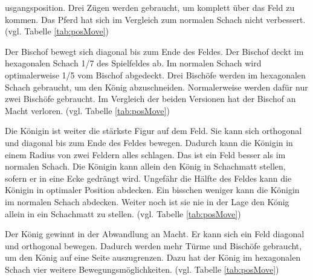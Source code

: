 usgangsposition. Drei Zügen werden gebraucht, um komplett über das Feld zu kommen. Das Pferd hat sich im Vergleich zum normalen Schach nicht verbessert. \cite{GlinskiHexaChess} (vgl. Tabelle \ref{tab:posMove})\par
Der Bischof bewegt sich diagonal bis zum Ende des Feldes. Der Bischof deckt im hexagonalen Schach 1/7 des Spielfeldes ab. Im normalen Schach wird optimalerweise 1/5 vom Bischof abgedeckt. Drei Bischöfe werden im hexagonalen Schach gebraucht, um den König abzuschneiden. Normalerweise werden dafür nur zwei Bischöfe gebraucht. Im Vergleich der beiden Versionen hat der Bischof an Macht verloren. \cite{GlinskiHexaChess} (vgl. Tabelle \ref{tab:posMove})\par
Die Königin ist weiter die stärkste Figur auf dem Feld. Sie kann sich orthogonal und diagonal bis zum Ende des Feldes bewegen. Dadurch kann die Königin in einem Radius von zwei Feldern alles schlagen. Das ist ein Feld besser als im normalen Schach. Die Königin kann allein den König in Schachmatt stellen, sofern er in eine Ecke gedrängt wird. Ungefähr die Hälfte des Feldes kann die Königin in optimaler Position abdecken. Ein bisschen weniger kann die Königin im normalen Schach abdecken. Weiter noch ist sie nie in der Lage den König allein in ein Schachmatt zu stellen. \cite{GlinskiHexaChess} (vgl. Tabelle \ref{tab:posMove})\par
Der König gewinnt in der Abwandlung an Macht. Er kann sich ein Feld diagonal und orthogonal bewegen. Dadurch werden mehr Türme und Bischöfe gebraucht, um den König auf eine Seite auszugrenzen. Dazu hat der König im hexagonalen Schach vier weitere Bewegungsmöglichkeiten. \cite{GlinskiHexaChess} (vgl. Tabelle \ref{tab:posMove})
